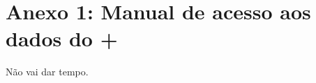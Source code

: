 



\chapter{Anexo 1: Manual de acesso aos dados do \starlight + \galex}
\label{anexo:ManualStarlightGalex}

Não vai dar tempo.

